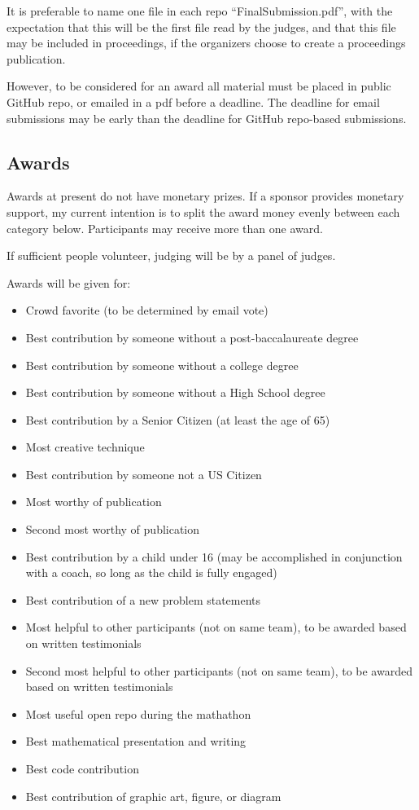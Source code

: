 \documentclass[11pt]{article}
\begin{document}
It is preferable to name one file in each repo ``FinalSubmission.pdf'', with the expectation that this
will be the first file read by the judges, and that this file may be included in proceedings, if the
organizers choose to create a proceedings publication.

However, to be considered for an
award all material must be placed in public GitHub repo, or emailed in a pdf before a deadline.
The deadline for email submissions may be early than the deadline for GitHub repo-based submissions.

\subsection{Awards}

Awards at present do not have monetary prizes. If a sponsor provides monetary support, my current intention is to split
the award money evenly between each category below. Participants may receive more than one award.

If sufficient people volunteer, judging will be by a panel of judges.

Awards will be given for:
\begin{itemize}
\item Crowd favorite (to be determined by email vote)
\item Best contribution by someone without a post-baccalaureate degree
\item Best contribution by someone without a college degree
\item Best contribution by someone without a High School degree
\item Best contribution by a Senior Citizen (at least the age of 65)
\item Most creative technique
\item Best contribution by someone not a US Citizen
\item Most worthy of publication
\item Second most worthy of publication
\item Best contribution by a child under 16 (may be accomplished in conjunction with a coach, so long as the child is fully engaged)
\item Best contribution of a new problem statements
\item Most helpful to other participants (not on same team), to be awarded based on written testimonials
\item Second most helpful to other participants (not on same team), to be awarded based on written testimonials
\item Most useful open repo during the mathathon
\item Best mathematical presentation and writing
\item Best code contribution
\item Best contribution of graphic art, figure, or diagram
\end{itemize}
\end{document}
